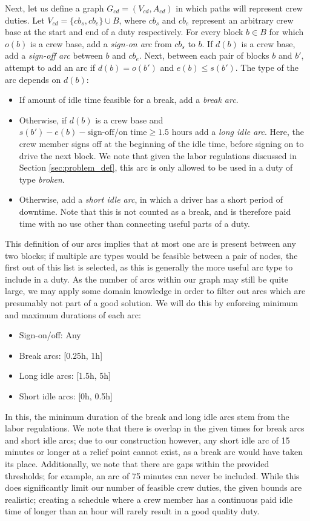 \documentclass[]{article}
\begin{document}
Next, let us define a graph $G_{cd} = (V_{cd}, A_{cd})$ in which paths will represent crew duties. Let $V_{cd} = \{ cb_s, cb_e \} \cup B$, where $cb_s$ and $cb_e$ represent an arbitrary crew base at the start and end of a duty respectively. For every block $b \in B$ for which $o(b)$ is a crew base, add a \textit{sign-on arc} from $cb_s$ to $b$. If $d(b)$ is a crew base, add a \textit{sign-off arc} between $b$ and $cb_e$. Next, between each pair of blocks $b$ and $b'$, attempt to add an arc if $d(b) = o(b')$ and $e(b) \leq s(b')$. The type of the arc depends on $d(b)$:
\begin{itemize}
    \item If amount of idle time feasible for a break, add a \textit{break arc}.
  \item Otherwise, if $d(b)$ is a crew base and $s(b') - e(b) - \text{sign-off/on time} \geq 1.5\text{ hours}$ add a \textit{long idle arc}. Here, the crew member signs off at the beginning of the idle time, before signing on to drive the next block. We note that given the labor regulations discussed in Section \ref{sec:problem_def}, this arc is only allowed to be used in a duty of type \textit{broken}.
  \item Otherwise, add a \textit{short idle arc}, in which a driver has a short period of downtime. Note that this is not counted as a break, and is therefore paid time with no use other than connecting useful parts of a duty. 
\end{itemize}
This definition of our arcs implies that at most one arc is present between any two blocks; if multiple arc types would be feasible between a pair of nodes, the first out of this list is selected, as this is generally the more useful arc type to include in a duty. As the number of arcs within our graph may still be quite large, we may apply some domain knowledge in order to filter out arcs which are presumably not part of a good solution. We will do this by enforcing  minimum and maximum durations of each arc:
\begin{itemize}
  \item Sign-on/off: Any
  \item Break arcs: [0.25h, 1h]
  \item Long idle arcs: [1.5h, 5h]
  \item Short idle arcs: [0h, 0.5h]
\end{itemize} 
In this, the minimum duration of the break and long idle arcs stem from the labor regulations. We note that there is overlap in the given times for break arcs and short idle arcs; due to our construction however, any short idle arc of 15 minutes or longer at a relief point cannot exist, as a break arc would have taken its place. Additionally, we note that there are gaps within the provided thresholds; for example, an arc of 75 minutes can never be included. While this does significantly limit our number of feasible crew duties, the given bounds are realistic; creating a schedule where a crew member has a continuous paid idle time of longer than an hour will rarely result in a good quality duty.
\end{document}
